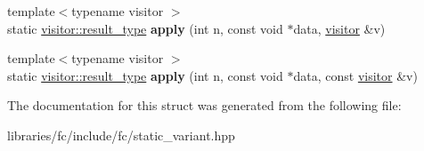 \begin{DoxyCompactItemize}
\mbox{\label{structfc_1_1impl_1_1storage__ops_3_01_n_00_01_t_01_6_00_01_ts_8_8_8_01_4_a15cc53e283553788b76d21a1008dd1c4}} 
{\footnotesize template$<$typename visitor $>$ }\\static \mbox{\hyperlink{struct_result}{visitor\+::result\+\_\+type}} {\bfseries apply} (int n, const void $\ast$data, \mbox{\hyperlink{structfc_1_1visitor}{visitor}} \&v)
\item 
\mbox{\label{structfc_1_1impl_1_1storage__ops_3_01_n_00_01_t_01_6_00_01_ts_8_8_8_01_4_a34ec70ba39abe785ba424ab0e8e62da4}} 
{\footnotesize template$<$typename visitor $>$ }\\static \mbox{\hyperlink{struct_result}{visitor\+::result\+\_\+type}} {\bfseries apply} (int n, const void $\ast$data, const \mbox{\hyperlink{structfc_1_1visitor}{visitor}} \&v)
\end{DoxyCompactItemize}


The documentation for this struct was generated from the following file\+:\begin{DoxyCompactItemize}
\item 
libraries/fc/include/fc/static\+\_\+variant.\+hpp\end{DoxyCompactItemize}
